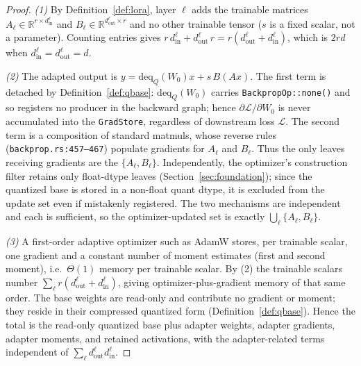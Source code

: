 \documentclass[11pt]{article}
\begin{document}
\begin{proof}
\emph{(1)} By Definition~\ref{def:lora}, layer $\ell$ adds the trainable matrices $A_\ell \in \mathbb{R}^{r \times d^{\ell}_{\text{in}}}$ and $B_\ell \in \mathbb{R}^{d^{\ell}_{\text{out}} \times r}$ and no other trainable tensor ($s$ is a fixed scalar, not a parameter). Counting entries gives $r\,d^{\ell}_{\text{in}} + d^{\ell}_{\text{out}}\,r = r(d^{\ell}_{\text{out}} + d^{\ell}_{\text{in}})$, which is $2rd$ when $d^{\ell}_{\text{in}} = d^{\ell}_{\text{out}} = d$.

\emph{(2)} The adapted output is $y = \mathrm{deq}_Q(W_0) x + s\,B(Ax)$. The first term is detached by Definition~\ref{def:qbase}: $\mathrm{deq}_Q(W_0)$ carries \texttt{BackpropOp::none()} and so registers no producer in the backward graph; hence $\partial \mathcal{L} / \partial W_0$ is never accumulated into the \texttt{GradStore}, regardless of downstream loss $\mathcal{L}$. The second term is a composition of standard matmuls, whose reverse rules (\texttt{backprop.rs:457--467}) populate gradients for $A_\ell$ and $B_\ell$. Thus the only leaves receiving gradients are the $\{A_\ell, B_\ell\}$. Independently, the optimizer's construction filter retains only float-dtype leaves (Section~\ref{sec:foundation}); since the quantized base is stored in a non-float quant dtype, it is excluded from the update set even if mistakenly registered. The two mechanisms are independent and each is sufficient, so the optimizer-updated set is exactly $\bigcup_{\ell} \{A_\ell, B_\ell\}$.

\emph{(3)} A first-order adaptive optimizer such as AdamW stores, per trainable scalar, one gradient and a constant number of moment estimates (first and second moment), i.e.\ $\Theta(1)$ memory per trainable scalar. By (2) the trainable scalars number $\sum_{\ell} r(d^{\ell}_{\text{out}} + d^{\ell}_{\text{in}})$, giving optimizer-plus-gradient memory of that same order. The base weights are read-only and contribute no gradient or moment; they reside in their compressed quantized form (Definition~\ref{def:qbase}). Hence the total is the read-only quantized base plus adapter weights, adapter gradients, adapter moments, and retained activations, with the adapter-related terms independent of $\sum_\ell d^{\ell}_{\text{out}} d^{\ell}_{\text{in}}$.
\end{proof}
\end{document}
